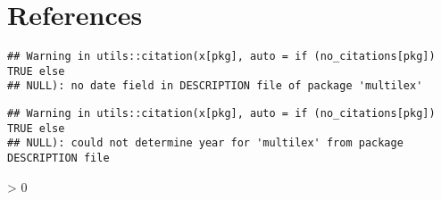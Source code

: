 \documentclass[
  english,
  man]{apa6}
\newlength{\cslhangindent}
\newenvironment{CSLReferences}[2] %
 {%
  \setlength{\parindent}{0pt}
  \ifodd #1 \everypar{\setlength{\hangindent}{\cslhangindent}}\ignorespaces\fi
  \ifnum #2 > 0
  \setlength{\parskip}{#2\baselineskip}
  \fi
 }%
 {}
\begin{document}
\newpage

\hypertarget{references}{%
\section{References}\label{references}}

\begin{verbatim}
## Warning in utils::citation(x[pkg], auto = if (no_citations[pkg]) TRUE else
## NULL): no date field in DESCRIPTION file of package 'multilex'
\end{verbatim}

\begin{verbatim}
## Warning in utils::citation(x[pkg], auto = if (no_citations[pkg]) TRUE else
## NULL): could not determine year for 'multilex' from package DESCRIPTION file
\end{verbatim}

\begingroup
\setlength{\parindent}{-0.5in}
\setlength{\leftskip}{0.5in}

\hypertarget{refs}{}
\begin{CSLReferences}{0}{0}
\end{CSLReferences}

\endgroup
\end{document}
